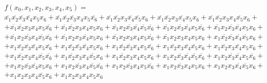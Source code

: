 \documentclass{article}
\begin{document}
\begin{equation*}
\begin{array}{cc}f(x_0, x_1, x_2, x_3, x_4, x_5) =
\\
\overline{x_{1}}\overline{x_{2}}\overline{x_{3}}\overline{x_{4}}x_{5}x_{6}+\overline{x_{1}}\overline{x_{2}}\overline{x_{3}}x_{4}x_{5}\overline{x_{6}}+\overline{x_{1}}\overline{x_{2}}x_{3}\overline{x_{4}}\overline{x_{5}}x_{6}+\overline{x_{1}}\overline{x_{2}}x_{3}\overline{x_{4}}x_{5}x_{6}+\overline{x_{1}}\overline{x_{2}}x_{3}x_{4}\overline{x_{5}}x_{6}+
\\
+\overline{x_{1}}\overline{x_{2}}x_{3}x_{4}x_{5}\overline{x_{6}}+\overline{x_{1}}\overline{x_{2}}x_{3}x_{4}x_{5}x_{6}+\overline{x_{1}}x_{2}\overline{x_{3}}\overline{x_{4}}\overline{x_{5}}\overline{x_{6}}+\overline{x_{1}}x_{2}\overline{x_{3}}\overline{x_{4}}x_{5}\overline{x_{6}}+\overline{x_{1}}x_{2}\overline{x_{3}}\overline{x_{4}}x_{5}x_{6}+
\\
+\overline{x_{1}}x_{2}\overline{x_{3}}x_{4}\overline{x_{5}}\overline{x_{6}}+\overline{x_{1}}x_{2}x_{3}\overline{x_{4}}x_{5}x_{6}+\overline{x_{1}}x_{2}x_{3}x_{4}x_{5}\overline{x_{6}}+\overline{x_{1}}x_{2}x_{3}x_{4}x_{5}x_{6}+x_{1}\overline{x_{2}}\overline{x_{3}}\overline{x_{4}}\overline{x_{5}}x_{6}+
\\
+x_{1}\overline{x_{2}}\overline{x_{3}}\overline{x_{4}}x_{5}\overline{x_{6}}+x_{1}\overline{x_{2}}\overline{x_{3}}\overline{x_{4}}x_{5}x_{6}+x_{1}\overline{x_{2}}\overline{x_{3}}x_{4}x_{5}\overline{x_{6}}+x_{1}\overline{x_{2}}x_{3}\overline{x_{4}}\overline{x_{5}}x_{6}+x_{1}\overline{x_{2}}x_{3}\overline{x_{4}}x_{5}x_{6}+
\\
+x_{1}\overline{x_{2}}x_{3}x_{4}\overline{x_{5}}\overline{x_{6}}+x_{1}\overline{x_{2}}x_{3}x_{4}\overline{x_{5}}x_{6}+x_{1}\overline{x_{2}}x_{3}x_{4}x_{5}x_{6}+x_{1}x_{2}\overline{x_{3}}\overline{x_{4}}\overline{x_{5}}\overline{x_{6}}+x_{1}x_{2}\overline{x_{3}}\overline{x_{4}}x_{5}\overline{x_{6}}+
\\
+x_{1}x_{2}\overline{x_{3}}\overline{x_{4}}x_{5}x_{6}+x_{1}x_{2}\overline{x_{3}}x_{4}\overline{x_{5}}\overline{x_{6}}+x_{1}x_{2}\overline{x_{3}}x_{4}x_{5}\overline{x_{6}}+x_{1}x_{2}\overline{x_{3}}x_{4}x_{5}x_{6}+x_{1}x_{2}x_{3}\overline{x_{4}}\overline{x_{5}}x_{6}+
\\
+x_{1}x_{2}x_{3}x_{4}\overline{x_{5}}x_{6}+x_{1}x_{2}x_{3}x_{4}x_{5}x_{6}
\end{array}
\end{equation*}
\end{document}
